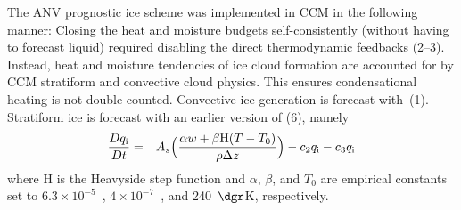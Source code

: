 \ifphdcsz{\thispagestyle{myheadings}}{}
The ANV prognostic ice scheme \cite[][to which the following
equation numbers refer]{ZeK961} was implemented in CCM in the
following manner:
Closing the heat and moisture budgets self-consistently (without
having to forecast liquid) required disabling the direct thermodynamic
feedbacks (2--3).
Instead, heat and moisture tendencies of ice cloud formation are
accounted for by CCM stratiform and convective cloud physics.
This ensures condensational heating is not double-counted.
Convective ice generation is forecast with~(1).
Stratiform ice is forecast with an earlier version of (6), namely 
\begin{eqnarray}
\label{eqn:qi_stb_old}
{D\qi \over Dt} & 
= & 
A_s \Bigl(
{\alpha w + \beta {\mathrm H}(T - T_0) \over \rho \Delta z} 
\Bigr) -
c_2 \qi - 
c_3 \qi
\end{eqnarray}
where ${\mathrm H}$ is the Heavyside step function and $\alpha$,
$\beta$, and $T_0$ are empirical constants set to $6.3 \times
10^{-5}$~\kgxmC, $4 \times 10^{-7}$~\kgxmSsk, and 240~$\dgr$K,  
respectively. 
